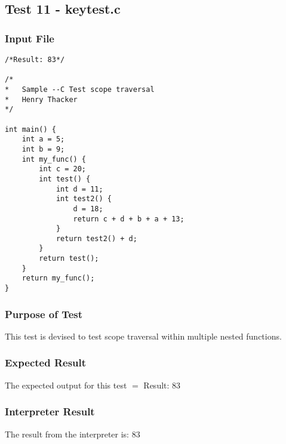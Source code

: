 \subsection{Test 11 - keytest.c}
\subsubsection{Input File}
\begin{lstlisting}[showstringspaces=false,breaklines=true,backgroundcolor=\color{light-gray}, captionpos=b]
/*Result: 83*/

/*
*	Sample --C Test scope traversal
*	Henry Thacker
*/

int main() {
	int a = 5;
	int b = 9;
	int my_func() {
		int c = 20;		
		int test() {
			int d = 11;
			int test2() {  
				d = 18;
				return c + d + b + a + 13;
			}
			return test2() + d;
		}
		return test();
	}
	return my_func();
}
\end{lstlisting}\subsubsection{Purpose of Test}
This test is devised to test scope traversal within multiple nested functions.

\subsubsection{Expected Result}
The expected output for this test $=$ Result: 83
\subsubsection{Interpreter Result}
The result from the interpreter is: 83
